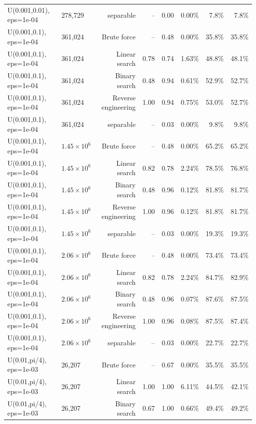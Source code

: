 \begin{tabular}{llrrrrrr}
U(0.001,0.01), eps=1e-04 & 278,729 & separable & -- & 0.00 & 0.00\% & 7.8\% & 7.8\% \\
U(0.001,0.1), eps=1e-04 & 361,024 & Brute force & -- & 0.48 & 0.00\% & 35.8\% & 35.8\% \\
U(0.001,0.1), eps=1e-04 & 361,024 & Linear search & 0.78 & 0.74 & 1.63\% & 48.8\% & 48.1\% \\
U(0.001,0.1), eps=1e-04 & 361,024 & Binary search & 0.48 & 0.94 & 0.61\% & 52.9\% & 52.7\% \\
U(0.001,0.1), eps=1e-04 & 361,024 & Reverse engineering & 1.00 & 0.94 & 0.75\% & 53.0\% & 52.7\% \\
U(0.001,0.1), eps=1e-04 & 361,024 & separable & -- & 0.03 & 0.00\% & 9.8\% & 9.8\% \\
U(0.001,0.1), eps=1e-04 & $1.45\times 10^{6}$ & Brute force & -- & 0.48 & 0.00\% & 65.2\% & 65.2\% \\
U(0.001,0.1), eps=1e-04 & $1.45\times 10^{6}$ & Linear search & 0.82 & 0.78 & 2.24\% & 78.5\% & 76.8\% \\
U(0.001,0.1), eps=1e-04 & $1.45\times 10^{6}$ & Binary search & 0.48 & 0.96 & 0.12\% & 81.8\% & 81.7\% \\
U(0.001,0.1), eps=1e-04 & $1.45\times 10^{6}$ & Reverse engineering & 1.00 & 0.96 & 0.12\% & 81.8\% & 81.7\% \\
U(0.001,0.1), eps=1e-04 & $1.45\times 10^{6}$ & separable & -- & 0.03 & 0.00\% & 19.3\% & 19.3\% \\
U(0.001,0.1), eps=1e-04 & $2.06\times 10^{6}$ & Brute force & -- & 0.48 & 0.00\% & 73.4\% & 73.4\% \\
U(0.001,0.1), eps=1e-04 & $2.06\times 10^{6}$ & Linear search & 0.82 & 0.78 & 2.24\% & 84.7\% & 82.9\% \\
U(0.001,0.1), eps=1e-04 & $2.06\times 10^{6}$ & Binary search & 0.48 & 0.96 & 0.07\% & 87.6\% & 87.5\% \\
U(0.001,0.1), eps=1e-04 & $2.06\times 10^{6}$ & Reverse engineering & 1.00 & 0.96 & 0.08\% & 87.5\% & 87.4\% \\
U(0.001,0.1), eps=1e-04 & $2.06\times 10^{6}$ & separable & -- & 0.03 & 0.00\% & 22.7\% & 22.7\% \\
U(0.01,pi/4), eps=1e-03 & 26,207 & Brute force & -- & 0.67 & 0.00\% & 35.5\% & 35.5\% \\
U(0.01,pi/4), eps=1e-03 & 26,207 & Linear search & 1.00 & 1.00 & 6.11\% & 44.5\% & 42.1\% \\
U(0.01,pi/4), eps=1e-03 & 26,207 & Binary search & 0.67 & 1.00 & 0.66\% & 49.4\% & 49.2\% \\

\end{tabular}
